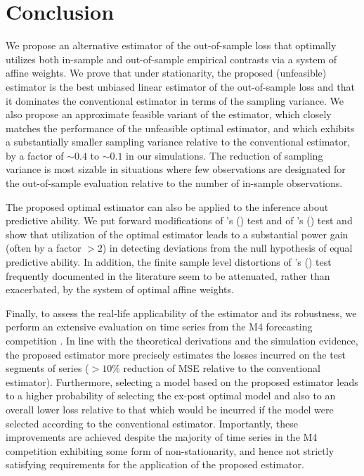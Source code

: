 \documentclass[11pt,dvipsnames]{article}
\newcommand{\possessivecite}[1]{\citeauthor{#1}'s (\citeyear{#1})}
\begin{document}
\section{Conclusion}\label{Conclusions}
We propose an alternative estimator of the out-of-sample loss that optimally utilizes both in-sample and out-of-sample empirical contrasts via a system of affine weights. We prove that under stationarity, the proposed (unfeasible) estimator is the best unbiased linear estimator of the out-of-sample loss and that it dominates the conventional estimator in terms of the sampling variance. We also propose an approximate feasible variant of the estimator, which closely matches the performance of the unfeasible optimal estimator, and which exhibits a substantially smaller sampling variance relative to the conventional estimator, by a factor of $ \sim 0.4 $ to $ \sim 0.1 $ in our simulations. The reduction of sampling variance is most sizable in situations where few observations are designated for the out-of-sample evaluation relative to the number of in-sample observations. 

The proposed optimal estimator can also be applied to the inference about predictive ability. We put forward modifications of \possessivecite{dieboldComparingPredictiveAccuracy1995} test and of \possessivecite{ibragimovTStatisticBasedCorrelation2010} test and show that utilization of the optimal estimator leads to a substantial power gain (often by a factor $ >2 $) in detecting deviations from the null hypothesis of equal predictive ability. In addition, the finite sample level distortions of \possessivecite{dieboldComparingPredictiveAccuracy1995} test frequently documented in the literature seem to be attenuated, rather than exacerbated, by the system of optimal affine weights. 

Finally, to assess the real-life applicability of the estimator and its robustness, we perform an extensive evaluation on time series from the M4 forecasting competition \citep{makridakisM4Competition1002020}. In line with the theoretical derivations and the simulation evidence, the proposed estimator more precisely estimates the losses incurred on the test segments of series ($ >10\% $ reduction of MSE relative to the conventional estimator). Furthermore, selecting a model based on the proposed estimator leads to a higher probability of selecting the ex-post optimal model and also to an overall lower loss relative to that which would be incurred if the model were selected according to the conventional estimator. Importantly, these improvements are achieved despite the majority of time series in the M4 competition exhibiting some form of non-stationarity, and hence not strictly satisfying requirements for the application of the proposed estimator. 
\end{document}
